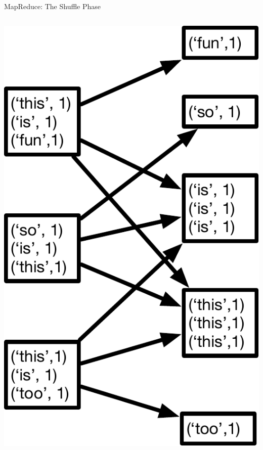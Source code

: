 \documentclass[aspectratio=169]{beamer}
\begin{document}
\begin{frame}{MapReduce: The Shuffle Phase}
\begin{columns}[c]
    	{\includegraphics[width=1\textwidth]{./lectBigData/shuffle.pdf}} \\
\end{columns}

\end{frame}
\end{document}
